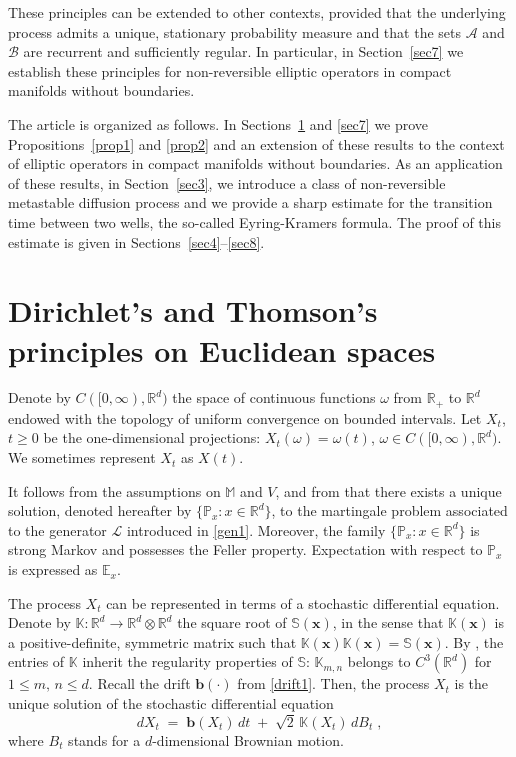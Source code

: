 \documentclass[reqno]{amsart}
\newcounter{as}[section]
\newcommand{\mc}[1]{{\mathcal #1}}
\newcommand{\bb}[1]{{\mathbb #1}}
\newcommand{\bs}[1]{{\boldsymbol #1}}
\newcommand{\<}{\langle}
\renewcommand{\>}{\rangle}
\begin{document}
These principles can be extended to other contexts, provided that the underlying process admits a unique, stationary probability measure and that the sets $\mc A$ and $\mc B$ are recurrent and sufficiently regular. In particular, in Section~\ref{sec7} we establish these principles for non-reversible elliptic operators in compact manifolds without boundaries.

The article is organized as follows. In Sections~\ref{sec1} and \ref{sec7} we prove Propositions~\ref{prop1} and \ref{prop2} and an
extension of these results to the context of elliptic operators in compact manifolds without boundaries. As an application of these results, in Section~\ref{sec3}, we introduce a class of non-reversible metastable diffusion process and we provide a sharp estimate for the transition time between two wells, the so-called Eyring-Kramers formula. The proof of this estimate is given in Sections~\ref{sec4}--\ref{sec8}.

\section{Dirichlet's and Thomson's principles on Euclidean spaces}
\label{sec1}

Denote by $C([0,\infty), \bb R^d)$ the space of continuous functions
$\omega$ from $\bb R_+$ to $\bb R^d$ endowed with the topology of
uniform convergence on bounded intervals. Let $X_t$, $t\ge 0$ be the
one-dimensional projections: $X_t(\omega) = \omega(t)$, $\omega \in
C([0,\infty), \bb R^d)$. We sometimes represent $X_t$ as $X(t)$.

It follows from the assumptions on $\bb M$ and $V$, and from \cite
[Theorems~1.10.4 and 1.10.6]{p95} that there exists a unique solution, denoted hereafter by $\{\bb P_x : x\in \bb R^d\}$, to the martingale problem associated to the generator $\mc L$ introduced in \eqref{gen1}. Moreover, the family $\{\bb P_x : x\in \bb R^d\}$ is strong Markov and possesses the Feller property. Expectation with
respect to $\bb P_x$ is expressed as $\bb E_x$.

The process $X_t$ can be represented in terms of a stochastic
differential equation.  Denote by $\bb K\colon\bb R^d \to \bb R^d \otimes
\bb R^d$ the square root of $\bb S (\bs{x})$, in the sense that $\bb K
(\bs{x})$ is a positive-definite, symmetric matrix such that $\bb K
(\bs{x}) \bb K(\bs{x}) = \bb S (\bs{x})$. By \cite[Lemma~6.1.1]{f},
the entries of $\bb K$ inherit the regularity properties of $\bb S$:
$\bb K_{m,n}$ belongs to $C^3(\bb R^d)$ for $1\le m,\,n\le d$. Recall
the drift $\bs{b}(\cdot)$ from \eqref{drift1}. Then, the process $X_t$
is the unique solution of the stochastic differential equation
\begin{equation*}
d X_t \;=\; \bs b (X_t) \, dt \;+\; \sqrt{2} \, \bb K (X_t) \, dB_t\;,
\end{equation*}
where $B_t$ stands for a $d$-dimensional Brownian motion.
\end{document}
